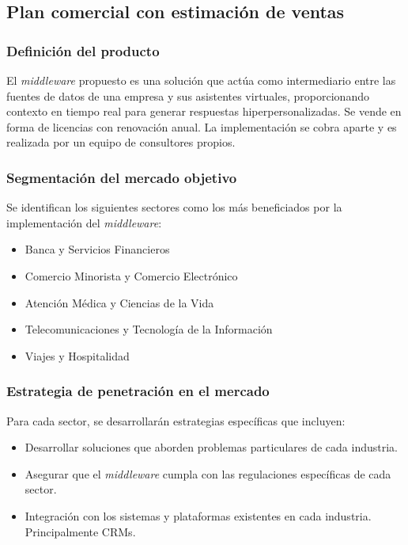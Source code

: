 \subsection{Plan comercial con estimación de ventas}

\subsubsection{Definición del producto}

El \textit{middleware} propuesto es una solución que actúa como intermediario entre las fuentes de datos de una empresa y sus asistentes virtuales, proporcionando contexto en tiempo real para generar respuestas hiperpersonalizadas. Se vende en forma de licencias con renovación anual. La implementación se cobra aparte y es realizada por un equipo de consultores propios.

\subsubsection{Segmentación del mercado objetivo}

Se identifican los siguientes sectores como los más beneficiados por la implementación del \textit{middleware}:

\begin{itemize}
    \item Banca y Servicios Financieros
    \item Comercio Minorista y Comercio Electrónico
    \item Atención Médica y Ciencias de la Vida
    \item Telecomunicaciones y Tecnología de la Información
    \item Viajes y Hospitalidad
\end{itemize}

\subsubsection{Estrategia de penetración en el mercado}

Para cada sector, se desarrollarán estrategias específicas que incluyen:

\begin{itemize}
    \item Desarrollar soluciones que aborden problemas particulares de cada industria.
    \item Asegurar que el \textit{middleware} cumpla con las regulaciones específicas de cada sector.
    \item Integración con los sistemas y plataformas existentes en cada industria. Principalmente CRMs.
\end{itemize}

